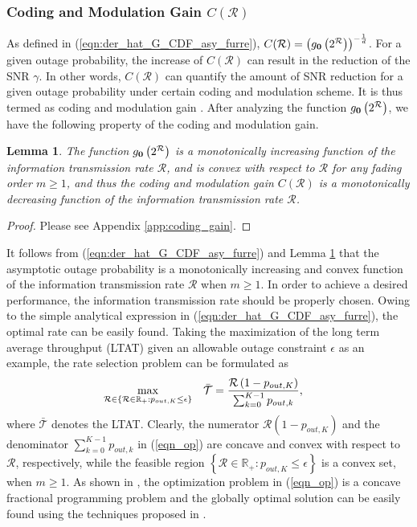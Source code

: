 \documentclass[12pt,onecolumn,draftcls]{IEEEtran}
\newtheorem{lemma}{Lemma}
\begin{document}
\subsubsection{Coding and Modulation Gain $C(\mathcal R)$}
As defined in (\ref{eqn:der_hat_G_CDF_asy_furre}), $C(\mathcal R)=\left({g_{{\bf{0}}}}\left( 2^{\cal R} \right)\right)^{-\frac{1}{d}}$. For a given outage probability, the increase of $C(\mathcal R)$ can result in the reduction of the SNR $\gamma $. In other words, $C(\mathcal R)$ can quantify the amount of SNR reduction for a given outage probability under certain coding and modulation scheme. It is thus termed as coding and modulation gain \cite{goldsmith2005wireless}. After analyzing the function ${g_{{\bf{0}}}}\left( 2^{\mathcal R} \right)$, we have the following property of the coding and modulation gain.
\begin{lemma}\label{the:coding_modulation_gain}
The function ${g_{{\bf{0}}}}\left( 2^{\mathcal R} \right)$ is a monotonically increasing function of the information transmission rate $\mathcal R$, and is convex with respect to $\mathcal R$ for any fading order $m \ge 1$, and thus the coding and modulation gain $C(\mathcal R)$ is a monotonically decreasing function of the information transmission rate $\mathcal R$.
\end{lemma}
\begin{proof}
Please see Appendix \ref{app:coding_gain}.
\end{proof}

It follows from (\ref{eqn:der_hat_G_CDF_asy_furre}) and Lemma \ref{the:coding_modulation_gain} that the asymptotic outage probability is a monotonically increasing and convex function of the information transmission rate $\mathcal R$ when $m \ge 1$. In order to achieve a desired performance, the information transmission rate should be properly chosen. Owing to the simple analytical expression in (\ref{eqn:der_hat_G_CDF_asy_furre}), the optimal rate can be easily found. Taking the maximization of the long term average throughput (LTAT) given an allowable outage constraint $\epsilon $ as an example, the rate selection problem can be formulated as
\begin{align}\label{eqn_op}
{\mathop {{\rm{max}}}\limits_{\mathcal R \in \left\{\mathcal R \in \mathbb R_+: {p_{out,K}} \le \epsilon \right\}} }&{\quad \bar {\mathcal T}  = \frac{{\mathcal R\left( {1 - {p_{out,K}}} \right)}}{{\sum\nolimits_{k = 0}^{K - 1} {{p_{out,k}}} }}},
\end{align}
where $\bar {\mathcal T}$ denotes the LTAT. Clearly, the numerator ${\mathcal R\left( {1 - {p_{out,K}}} \right)}$ and the denominator ${ \sum\nolimits_{k = 0}^{K - 1} {{p_{out,k}}} }$ in (\ref{eqn_op}) are concave and convex with respect to $\mathcal R$, respectively, while the feasible region $\left\{\mathcal R \in \mathbb R_+: {p_{out,K}} \le \epsilon \right\}$ is a convex set, when $m \ge 1$. As shown in \cite{dinkelbach1967nonlinear}, the optimization problem in (\ref{eqn_op}) is a concave fractional programming problem and the globally optimal solution can be easily found using the techniques proposed in \cite{dinkelbach1967nonlinear}.
\end{document}
